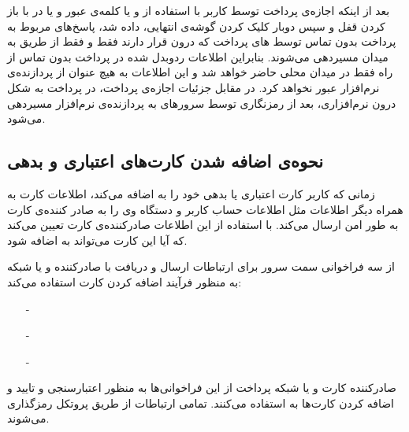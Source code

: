 \documentclass[oneside]{report}
\begin{document}
   	بعد از اینکه اجازه‌ی پرداخت توسط کاربر با استفاده از 
   	{\normalsize {}}
   	و یا کلمه‌ی عبور 
   	و یا در 
   	{\normalsize {}} با باز کردن قفل و سپس دوبار کلیک کردن گوشه‌ی انتهایی،  داده شد، پاسخ‌های مربوط به پرداخت بدون تماس توسط 
   	{\normalsize {}} های پرداخت 
   	که درون 
   	{\normalsize {}}
   	قرار دارند فقط و فقط از طریق 
   	{\normalsize {}}
   	به میدان 
   	{\normalsize {}}
   	مسیردهی می‌شوند. بنابراین اطلاعات ردوبدل شده در پرداخت بدون تماس از راه 
   	   	{\normalsize {}}
   	   	فقط در میدان 
   	   	   	{\normalsize {}}
   	  محلی حاضر خواهد شد و این اطلاعات به هیچ عنوان از پردازنده‌ی نرم‌افزار عبور نخواهد کرد.
   	  در مقابل جزئیات اجازه‌ی پرداخت،  در پرداخت به شکل درون نرم‌افزاری،  بعد از رمزنگاری توسط سرورهای 
   	     	{\normalsize {}}
   	   به پردازنده‌ی نرم‌افزار مسیردهی می‌شود.
   	   
   \subsection{نحوه‌ی اضافه شدن کارت‌های اعتباری و بدهی}
   	زمانی که کاربر کارت اعتباری یا بدهی خود را به 
   	   	   	   	{\normalsize {}}
   	 اضافه می‌کند،
   	    	   	   	{\normalsize {}} 
   	 اطلاعات کارت به همراه دیگر اطلاعات مثل اطلاعات حساب کاربر و دستگاه وی را به صادر کننده‌ی کارت به طور امن ارسال می‌کند. با استفاده از این اطلاعات صادرکننده‌ی کارت تعیین می‌کند که آیا این کارت می‌تواند به 
   	    	   	   	{\normalsize {}}
   	    	   	   اضافه شود.
   	    	   	   
   	{\normalsize {}} 
   	از سه فراخوانی سمت سرور برای ارتباطات ارسال و دریافت با صادرکننده‌ و یا شبکه به منظور فرآیند اضافه کردن کارت استفاده می‌کند:
   	\begin{itemize}
   		\item[-]    	{\normalsize {}}
   		\item[-] 	   	{\normalsize {}}
   		\item[-]	   	{\normalsize {}}  
   	\end{itemize}
   	      صادرکننده کارت و یا شبکه پرداخت از این فراخوانی‌ها به منظور اعتبارسنجی و تایید و اضافه کردن کارت‌ها به 
   	         	{\normalsize {}} 
   	         	استفاده می‌کنند.
  تمامی ارتباطات 
     	{\normalsize {}} 
     	از طریق پروتکل 
     	   	{\normalsize {}} 
     	   	رمزگذاری می‌شوند.       					       
     	   	
\end{document}
